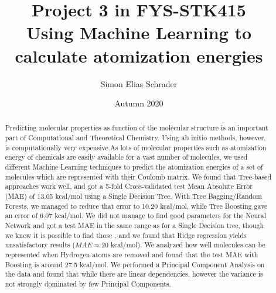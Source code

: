 \documentclass[11pt,a4paper,notitlepage]{article}
\title{Project 3 in FYS-STK415\\ \large Using Machine Learning to calculate atomization energies}
\author{Simon Elias Schrader }
\date{Autumn 2020}
\begin{document}
\maketitle
\tableofcontents
\listoffigures
\listoftables
\clearpage
\begin{abstract}
Predicting molecular properties as function of the molecular structure is an important part of Computational and Theoretical Chemistry. Using ab initio methods, however, is computationally very expensive.As lots of molecular properties such as atomization energy of chemicals are easily available for a vast number of molecules, we used different Machine Learning techniques to predict the atomization energies of a set of molecules which are represented with their Coulomb matrix. We found that Tree-based approaches work well, and got a 5-fold Cross-validated test Mean Absolute Error (MAE) of 13.05 kcal/mol using a Single Decision Tree. With Tree Bagging/Random Forests, we managed to reduce that error to 10.20 kcal/mol, while Tree Boosting gave an error of 6.07 kcal/mol. We did not manage to find good parameters for the Neural Network and got a test MAE in the same range as for a Single Decision tree, though we know it is possible to find those \citep{Atomization_network}, and we found that Ridge regression yields unsatisfactory results ($MAE \approx 20$ kcal/mol). We analyzed how well molecules can be represented when Hydrogen atoms are removed and found that the test MAE with Boosting is around 27.5 kcal/mol. We performed a Principal Component Analysis on the data and found that while there are linear dependencies, however the variance is not strongly dominated by few Principal Components. 
\end{abstract}
\end{document}
